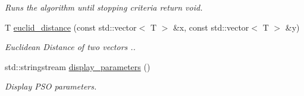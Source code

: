 \begin{DoxyCompactItemize}
\begin{DoxyCompactList}\small\item\em Runs the algorithm until stopping criteria return void. \end{DoxyCompactList}\item 
T \hyperlink{classea_1_1_solver_3_01_p_s_ol_00_01_t_00_01_f_00_01_c_01_4_a21df6a4efb4d058ecd3bc342e318b59a}{euclid\+\_\+distance} (const std\+::vector$<$ T $>$ \&x, const std\+::vector$<$ T $>$ \&y)
\begin{DoxyCompactList}\small\item\em Euclidean Distance of two vectors .. \end{DoxyCompactList}\item 
std\+::stringstream \hyperlink{classea_1_1_solver_3_01_p_s_ol_00_01_t_00_01_f_00_01_c_01_4_aaccd379111d0ebcf820fdce19ab23023}{display\+\_\+parameters} ()
\begin{DoxyCompactList}\small\item\em Display P\+SO parameters. \end{DoxyCompactList}\end{DoxyCompactItemize}
